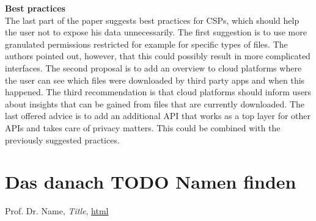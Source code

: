 \documentclass[11pt,twocolumn,a4paper,DIV=calc]{scrartcl}
\begin{document}
\textbf{Best practices} \\
The last part of the paper suggests best practices for CSPs, which should help the user not to expose his data unnecessarily. The first suggestion is to use more granulated permissions restricted for example for specific types of files. The authors pointed out, however, that this could possibly result in more complicated interfaces. The second proposal is to add an overview to cloud platforms where the user can see which files were downloaded by third party apps and when this happened. The third recommendation is that cloud platforms should inform users about insights that can be gained from files that are currently downloaded. The last offered advice is to add an additional API that works as a top layer for other APIs and takes care of privacy matters. This could be combined with the previously suggested practices. 
\section{Das danach TODO Namen finden}
\begin{thebibliography}{99}
  Prof. Dr. Name, \emph{Title}, \url{html}
\end{thebibliography}
\end{document}
